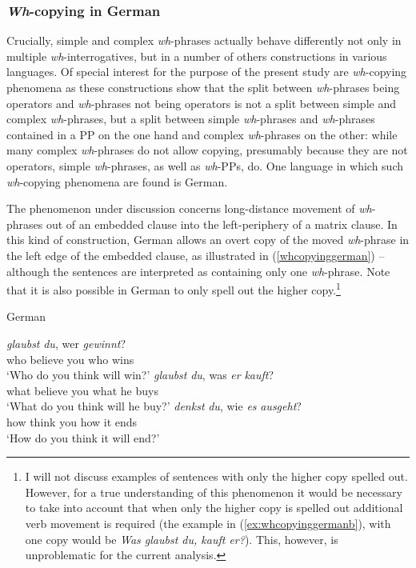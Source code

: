 \largerpage[-2]
\subsubsection{\textit{Wh}-copying in German}
Crucially, simple and complex \textit{wh}-phrases actually behave differently not only in multiple \textit{wh}-interrogatives, but in a number of others constructions in various languages. Of special interest for the purpose of the present study are \textit{wh}-copying phenomena as these constructions show that the split between \textit{wh}-phrases being operators and \textit{wh}-phrases not being operators is not a split between simple and complex \textit{wh}-phrases, but a split between simple \textit{wh}-phrases and \textit{wh}-phrases contained in a PP on the one hand and complex \textit{wh}-phrases on the other: while many complex \textit{wh}-phrases do not allow copying, presumably because they are not operators, simple \textit{wh}-phrases, as well as \textit{wh}-PPs, do. One language in which such \textit{wh}-copying phenomena are found is German.

The phenomenon under discussion concerns long-distance movement of \textit{wh}-phrases out of an embedded clause into the left-periphery of a matrix clause. In this kind of construction, German allows an overt copy of the moved \textit{wh}-phrase in the left edge of the embedded clause, as illustrated in (\ref{whcopyinggerman}) -- although the sentences are interpreted as containing only one \textit{wh}-phrase. Note that it is also possible in German to only spell out the higher copy.\footnote{I will not discuss examples of sentences with only the higher copy spelled out. However, for a true understanding of this phenomenon it would be necessary to take into account that when only the higher copy is spelled out additional verb movement is required (the example in (\ref{ex:whcopyinggermanb}), with one copy would be \textit{Was glaubst du, kauft er?}). This, however, is unproblematic for the current analysis.\label{footnotewh}} 

\begin{exe}
\ex German\label{whcopyinggerman}\begin{xlist}
\ex {} {\textit{glaubst}} {\textit{du},} {wer} {\textit{gewinnt}?} \\
{who} {believe} {you} {who} {wins}\\
\trans `Who do you think will win?' \label{ex:whcopyinggermana}
\ex {} {\textit{glaubst}} {\textit{du},} {was} {\textit{er}} {\textit{kauft}?} \\
{what} {believe} {you} {what} {he} {buys}\\
\trans `What do you think will he buy?' \label{ex:whcopyinggermanb}
\ex {} {\textit{denkst}} {\textit{du},} {wie} {\textit{es}} {\textit{ausgeht}?} \\
{how} {think} {you} {how} {it} {ends}\\
\trans `How do you think it will end?' \label{ex:whcopyinggermanc}
\end{xlist}
\end{exe}

